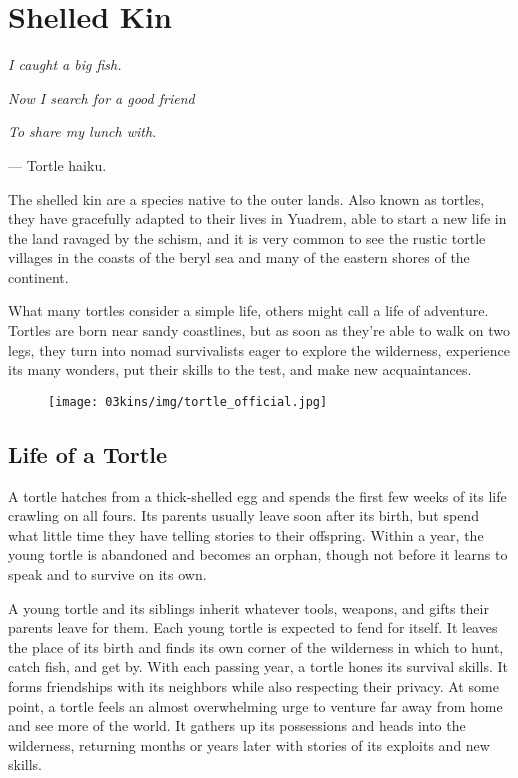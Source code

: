 
\section{Shelled Kin}
\begin{linenumbers}
\textit{I caught a big fish.}

\textit{Now I search for a good friend}

\textit{To share my lunch with.}

\hspace*{\fill} --- Tortle haiku.

The shelled kin are a species native to the outer lands.
Also known as tortles, they have gracefully adapted to their lives in Yuadrem, able to start a new life in the land ravaged by the schism, and it is very common to see the rustic tortle villages in the coasts of the beryl sea and many of the eastern shores of the continent.

What many tortles consider a simple life, others might call a life of adventure.
Tortles are born near sandy coastlines, but as soon as they're able to walk on two legs, they turn into nomad survivalists eager to explore the wilderness, experience its many wonders, put their skills to the test, and make new acquaintances.

\begin{figure}[!b]
    \centering
    \texttt{[image: 03kins/img/tortle\_official.jpg]}
\end{figure}

\subsection*{Life of a Tortle}
A tortle hatches from a thick-shelled egg and spends the first few weeks of its life crawling on all fours.
Its parents usually leave soon after its birth, but spend what little time they have telling stories to their offspring.
Within a year, the young tortle is abandoned and becomes an orphan, though not before it learns to speak and to survive on its own.

A young tortle and its siblings inherit whatever tools, weapons, and gifts their parents leave for them.
Each young tortle is expected to fend for itself.
It leaves the place of its birth and finds its own corner of the wilderness in which to hunt, catch fish, and get by.
With each passing year, a tortle hones its survival skills.
It forms friendships with its neighbors while also respecting their privacy.
At some point, a tortle feels an almost overwhelming urge to venture far away from home and see more of the world.
It gathers up its possessions and heads into the wilderness, returning months or years later with stories of its exploits and new skills.


\end{linenumbers}
